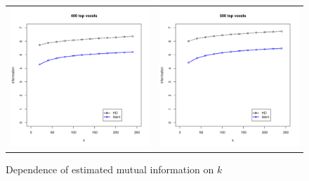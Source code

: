 \begin{figure}
\begin{tabular}{cc}
\includegraphics[scale = 0.4]{../../Yuval/ident_infer4_edited.pdf} &
\includegraphics[scale = 0.4]{../../Yuval/ident_infer5_edited.pdf}
\end{tabular}
\caption{Dependence of estimated mutual information on $k$}
\label{fig:dependence_k}
\end{figure}


